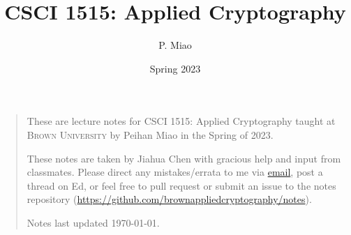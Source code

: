 \documentclass[letterpaper, 11pt, colorful, sections]{cs1515}
\title{CSCI 1515: Applied Cryptography}
\author{P. Miao}
\date{Spring 2023}
\numberwithin{equation}{section}
\begin{document}
\maketitle
\begin{quote}
    \quad These are lecture notes for CSCI 1515: Applied Cryptography taught at \textsc{Brown University} by Peihan Miao in the Spring of 2023.

    \quad These notes are taken by Jiahua Chen with gracious help and input from classmates. Please direct any mistakes/errata to me via \href{mailto:jiahua_chen2@brown.edu}{email}, post a thread on Ed, or feel free to pull request or submit an issue to the notes repository (\url{https://github.com/brownappliedcryptography/notes}).

    \quad Notes last updated \today.
\end{quote}
\tableofcontents
% 
% 

\newpage

\end{document}
